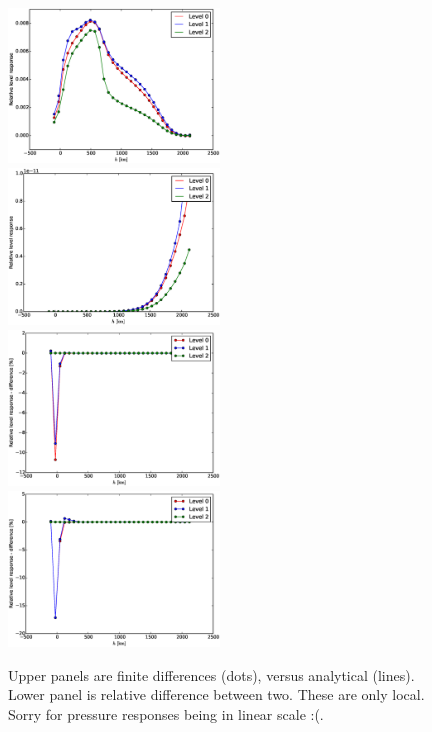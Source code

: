 \documentclass[a4paper,10pt]{article}
\begin{document}
\begin{figure}
 \includegraphics[width = 0.5\textwidth]{debug_local_responses_temperature.eps}
 \includegraphics[width = 0.5\textwidth]{debug_local_responses_density.eps}\\
 \includegraphics[width = 0.5\textwidth]{debug_local_responses_difference_temperature.eps}
 \includegraphics[width = 0.5\textwidth]{debug_local_responses_difference_density.eps}
 \caption{Upper panels are finite differences (dots), versus analytical (lines). Lower panel is relative difference between two. These are only local. Sorry for pressure responses being in linear scale :(. }
 \label{1}
\end{figure}
\end{document}
